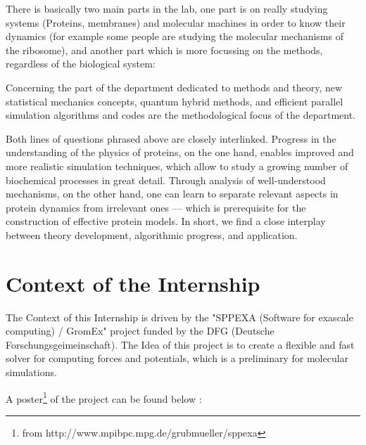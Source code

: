 \documentclass[12pt,twoside,a4paper]{report}
\begin{document}
There is basically two main parts in the lab, one part is on really studying systems (Proteins, membranes) and molecular machines in order to know their dynamics (for example some people are studying the molecular mechanisms of the ribosome), and another part which is more focussing on the methods, regardless of the biological system:

Concerning the part of the department dedicated to methods and theory, new statistical mechanics concepts, quantum hybrid methods, and efficient parallel simulation algorithms and codes are the methodological focus of the department.

Both lines of questions phrased above are closely interlinked. Progress in the understanding of the physics of proteins, on the one hand, enables improved and more realistic simulation techniques, which allow to study a growing number of biochemical processes in great detail. Through analysis of well-understood mechanisms, on the other hand, one can learn to separate relevant aspects in protein dynamics from irrelevant ones — which is prerequisite for the construction of effective protein models. In short, we find a close interplay between theory development, algorithmic progress, and application.  






\chapter{Context of the Internship}

The Context of this Internship is driven by the "SPPEXA (Software for exascale computing) / GromEx" project funded by the DFG (Deutsche Forschungsgeimeinschaft).
The Idea of this project is to create a flexible and fast solver for computing forces and potentials, which is a preliminary for molecular simulations.

A poster\footnote{from http://www.mpibpc.mpg.de/grubmueller/sppexa}   of the project can be found below :
\end{document}

